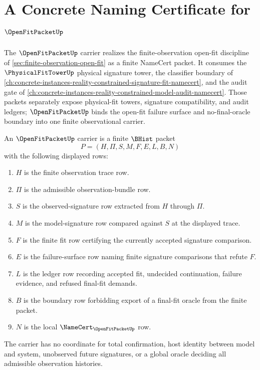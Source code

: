 \chapter{A Concrete Naming Certificate for $\OpenFitPacketUp$}
\label{ch:concrete-instances-open-fit-packet-namecert}

The $\OpenFitPacketUp$ carrier realizes the finite-observation open-fit discipline of \autoref{sec:finite-observation-open-fit} as a finite NameCert packet. It consumes the $\PhysicalFitTowerUp$ physical signature tower, the classifier boundary of \autoref{ch:concrete-instances-reality-constrained-signature-fit-namecert}, and the audit gate of \autoref{ch:concrete-instances-reality-constrained-model-audit-namecert}. Those packets separately expose physical-fit towers, signature compatibility, and audit ledgers; $\OpenFitPacketUp$ binds the open-fit failure surface and no-final-oracle boundary into one finite observational carrier.

\begin{definition}
\label{def:open-fit-packet-carrier}
An $\OpenFitPacketUp$ carrier is a finite $\BHist$ packet
$$
P=(H,\Pi,S,M,F,E,L,B,N)
$$
with the following displayed rows:
\begin{enumerate}
\item $H$ is the finite observation trace row.
\item $\Pi$ is the admissible observation-bundle row.
\item $S$ is the observed-signature row extracted from $H$ through $\Pi$.
\item $M$ is the model-signature row compared against $S$ at the displayed trace.
\item $F$ is the finite fit row certifying the currently accepted signature comparison.
\item $E$ is the failure-surface row naming finite signature comparisons that refute $F$.
\item $L$ is the ledger row recording accepted fit, undecided continuation, failure evidence, and refused final-fit demands.
\item $B$ is the boundary row forbidding export of a final-fit oracle from the finite packet.
\item $N$ is the local $\NameCert_{\OpenFitPacketUp}$ row.
\end{enumerate}
The carrier has no coordinate for total confirmation, host identity between model and system, unobserved future signatures, or a global oracle deciding all admissible observation histories.
\end{definition}

